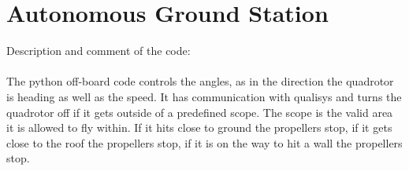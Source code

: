 
\section{Autonomous Ground Station}

Description and comment of the code: \\
\\
The python off-board code controls the angles, as in the direction the quadrotor is heading as well as the speed. It has communication with qualisys and turns the quadrotor off if it gets outside of a predefined scope. The scope is the valid area it is allowed to fly within. If it hits close to ground the propellers stop, if it gets close to the roof the propellers stop, if it is on the way to hit a wall the propellers stop. 

